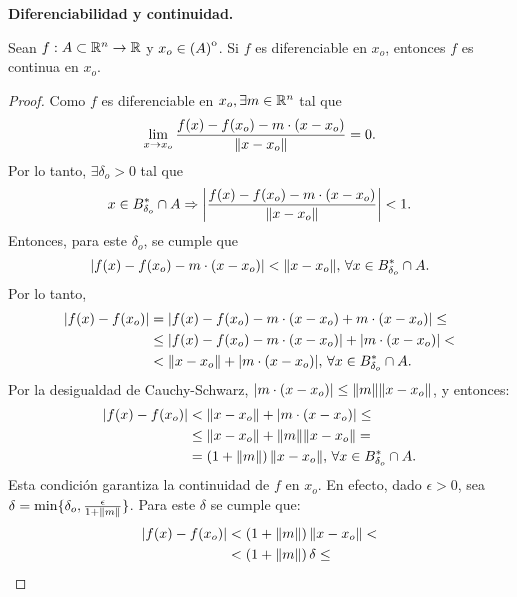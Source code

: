 \begin{theorem}\textbf{Diferenciabilidad y continuidad.} \label{teo:difCont}
\mbox{}

Sean $f: A \subset \mathbb{R}^n \to \mathbb{R}$ y $x_o \in {\kern0pt(A)}^{\mathrm{o}}$. Si $f$ es diferenciable en $x_o$, entonces $f$ es continua en $x_o$.
 \begin{proof}
 \mbox{}
 
 Como $f$ es diferenciable en $x_o, \exists m \in \mathbb{R}^n$ tal que
 \[
  \lim_{x \to x_o} \frac{f(x) - f(x_o) - m \cdot (x - x_o)}{\norm{x - x_o}} = 0.
 \]
Por lo tanto, $\exists \delta_o > 0$ tal que 
\[
 x \in B_{\delta_o}^* \cap A \Rightarrow 
 \abs{ \frac{f(x) - f(x_o) - m \cdot (x - x_o)}{\norm{x - x_o}} } < 1.
\]
Entonces, para este $\delta_o$, se cumple que
\[
 \abs{ f(x) - f(x_o) - m \cdot (x - x_o) } < \norm{x - x_o}, \, \forall x \in B_{\delta_o}^* \cap A.
\]
Por lo tanto,
\begin{align*}
\abs{ f(x) - f(x_o) } &=   \abs{ f(x) - f(x_o) - m \cdot (x - x_o) + m \cdot (x - x_o) } \le \\
                      &\le \abs{ f(x) - f(x_o) - m \cdot (x - x_o) } + \abs{ m \cdot (x - x_o) } < \\
                      &< \norm{x - x_o} + \abs{ m \cdot (x - x_o) }, \, 
                      \forall x \in B^*_{\delta_o} \cap A.
\end{align*}
Por la desigualdad de Cauchy-Schwarz, $\abs{ m \cdot (x - x_o) } \le \norm{m} \norm{x - x_o}$, y entonces:
\begin{align*}
\abs{ f(x) - f(x_o) } &< \norm{x - x_o} + \abs{ m \cdot (x - x_o) } \le \\
                      &\le \norm{x - x_o} + \norm{m} \norm{x - x_o} = \\
                      &=  \left( 1 + \norm{m} \right) \norm{x - x_o}, \, 
                      \forall x \in B^*_{\delta_o} \cap A.
\end{align*}
Esta condici\'on garantiza la continuidad de $f$ en $x_o$. En efecto, dado $\epsilon > 0$, sea $\delta = \min \{\delta_o, \frac{\epsilon}{1 + \norm{m}} \}$. Para este $\delta$ se cumple que:
\begin{align*}
 \abs{ f(x) - f(x_o) } &< \left( 1 + \norm{m} \right) \norm{x - x_o} < \\
                       &<   \left( 1 + \norm{m} \right) \delta \le \\

\end{align*}
\end{proof}
\end{theorem}
